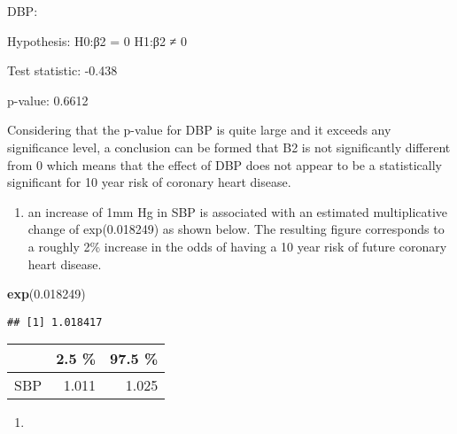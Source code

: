 \documentclass[]{article}
\newenvironment{Shaded}{\begin{snugshade}}{\end{snugshade}}
\newcommand{\DataTypeTok}[1]{\textcolor[rgb]{0.13,0.29,0.53}{#1}}
\newcommand{\DecValTok}[1]{\textcolor[rgb]{0.00,0.00,0.81}{#1}}
\newcommand{\FloatTok}[1]{\textcolor[rgb]{0.00,0.00,0.81}{#1}}
\newcommand{\KeywordTok}[1]{\textcolor[rgb]{0.13,0.29,0.53}{\textbf{#1}}}
\newcommand{\NormalTok}[1]{#1}
\newcommand{\OperatorTok}[1]{\textcolor[rgb]{0.81,0.36,0.00}{\textbf{#1}}}
\newcommand{\StringTok}[1]{\textcolor[rgb]{0.31,0.60,0.02}{#1}}
\providecommand{\tightlist}{%
  \setlength{\itemsep}{0pt}\setlength{\parskip}{0pt}}
\begin{document}
DBP:

Hypothesis: H0:β2 = 0 H1:β2 ≠ 0

Test statistic: -0.438

p-value: 0.6612

Considering that the p-value for DBP is quite large and it exceeds any
significance level, a conclusion can be formed that B2 is not
significantly different from 0 which means that the effect of DBP does
not appear to be a statistically significant for 10 year risk of
coronary heart disease.

\begin{enumerate}
\def\labelenumi{\alph{enumi})}
\setcounter{enumi}{3}
\tightlist
\item
  an increase of 1mm Hg in SBP is associated with an estimated
  multiplicative change of exp(0.018249) as shown below. The resulting
  figure corresponds to a roughly 2\% increase in the odds of having a
  10 year risk of future coronary heart disease.
\end{enumerate}

\begin{Shaded}
\begin{Highlighting}[]
\KeywordTok{exp}\NormalTok{(}\FloatTok{0.018249}\NormalTok{)}
\end{Highlighting}
\end{Shaded}

\begin{verbatim}
## [1] 1.018417
\end{verbatim}

\begin{Shaded}
\end{Shaded}

\begin{table}[H]
\centering
\begin{tabular}{l|r|r}
\hline
  & 2.5 \% & 97.5 \%\\
\hline
SBP & 1.011 & 1.025\\
\hline
\end{tabular}
\end{table}

\begin{enumerate}
\def\labelenumi{\alph{enumi})}
\setcounter{enumi}{4}
\item
\end{enumerate}
\end{document}
